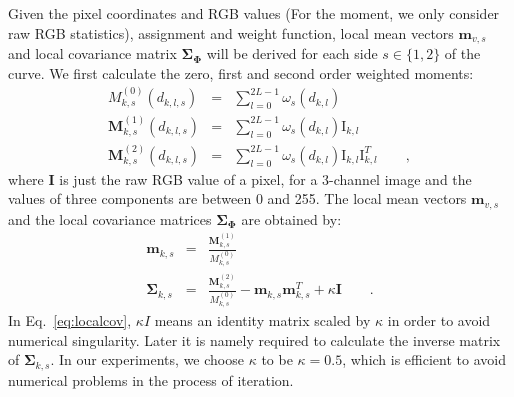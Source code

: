 \documentclass[conference]{IEEEtran}
\begin{document}
Given the pixel coordinates and RGB values (For the moment, we only consider raw RGB
statistics), assignment and weight
function, local mean vectors $\mathbf{m}_{v,s}$  and local covariance matrix
$\mathbf{\Sigma}_{\mathbf{\Phi}}$ will be derived for each side $s \in
\{1,2\}$ of the curve.
We first calculate the zero, first and second order weighted moments:
\begin{eqnarray}
  \label{eq:localm}
  M_{k,s}^{(0)}(d_{k,l,s}) &=& \sum_{l=0}^{2L-1} \omega_s(d_{k,l})\\
  \mathbf{M}_{k,s}^{(1)}(d_{k,l,s}) &=& \sum_{l=0}^{2L-1} \omega_s(d_{k,l}) \mathrm{I}_{k,l}\\
  \mathbf{M}_{k,s}^{(2)}(d_{k,l,s}) &=& \sum_{l=0}^{2L-1} \omega_s(d_{k,l}) \mathrm{I}_{k,l}\mathrm{I}_{k,l}^T\qquad,
\end{eqnarray}
where $\mathbf{I}$ is just the raw RGB value of a pixel, for a
3-channel image and the values of three components
are  between 0 and 255. The local mean vectors $\mathbf{m}_{v,s}$  and
the local covariance matrices
$\mathbf{\Sigma}_{\mathbf{\Phi}}$  are obtained by:
\begin{eqnarray}
  \label{eq:localmean}
  \mathbf{m}_{k,s} &=& \frac{\mathbf{M}^{(1)}_{k,s}}{M^{(0)}_{k,s}}\\
  \label{eq:localcov}
  \mathbf{\Sigma}_{k,s} &=& \frac{\mathbf{M}^{(2)}_{k,s}}{M^{(0)}_{k,s}}
  - \mathbf{m}_{k,s}\mathbf{m}_{k,s}^T  + \kappa \mathbf{I}\qquad.
\end{eqnarray}
In Eq.~\ref{eq:localcov}, $\kappa I$  means an identity matrix scaled by
$\kappa$ in order to avoid numerical singularity. Later it is namely
required to calculate the inverse matrix of
$\mathbf{\Sigma}_{k,s}$. In our experiments, we choose $\kappa$ to be
$\kappa = 0.5$, which is efficient to avoid numerical problems in the
process of iteration.
\end{document}
